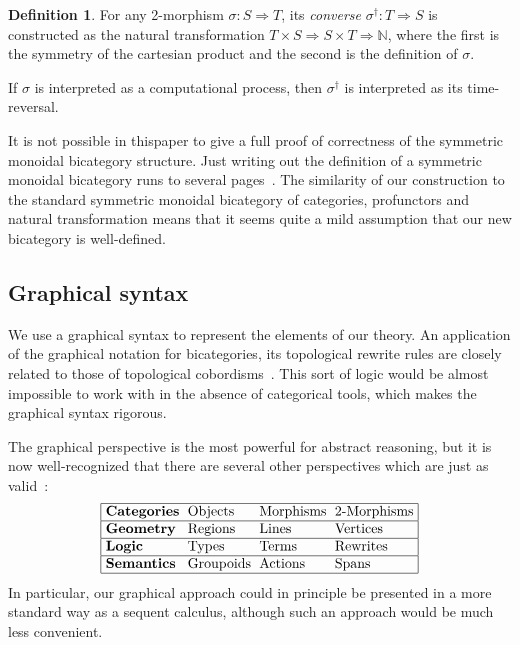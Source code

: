 \documentclass[a4paper,12pt]{article}
\newtheorem{lemma}[theorem]{Lemma}
\theoremstyle{definition}
\newtheorem{defn}[theorem]{Definition}
\newcommand\ignore[1]{}
\newcommand\cat[1]{{\ensuremath{\bf #1}}}
\newcommand\N{\ensuremath{\mathbb{N}}}
\renewcommand{\-}[0]{\nobreakdash-\hspace{0pt}}
\newcommand\GA{\cat{GpdAct}{}}
\begin{document}
\begin{defn}
For any 2-morphism $\sigma: S \Rightarrow T$, its \textit{converse} $\sigma ^\dag : T \Rightarrow S$ is constructed as the natural transformation \mbox{$T \times S \Rightarrow S \times T \Rightarrow \N$}, where the first is the symmetry of the cartesian product and the second is the definition of $\sigma$.
\end{defn}

\noindent
If $\sigma$ is interpreted as a computational process, then $\sigma ^\dag$ is interpreted as its time-reversal.

It is not possible in this{}paper to give a full proof of correctness of the symmetric monoidal bicategory structure. Just writing out the definition of a symmetric monoidal bicategory runs to several pages~\cite[Section 2.2]{sp11-thesis}. The similarity of our construction to the standard symmetric monoidal bicategory of categories, profunctors and natural transformation means that it seems quite a mild assumption that our new bicategory is well-defined.

\ignore{
We do check one detail here, to give a sense of the necessary proof style.
\begin{lemma}
Horizontal composition of 2\-cells in $\GA$ is well-defined.
\end{lemma}
\begin{proof}
LET'S SEE IF WE HAVE SPACE FOR THIS.
\end{proof}
}

\subsection{Graphical syntax}
\label{sec:syntax}

\noindent
We use a graphical syntax to represent the elements of our theory. An application of the graphical notation for bicategories, its topological rewrite rules are closely related to those of topological cobordisms~\cite{sp11-thesis}. This sort of logic would be almost impossible to work with in the absence of categorical tools, which makes the graphical syntax rigorous.

The graphical perspective is the most powerful for abstract reasoning, but it is now well-recognized that there are several other perspectives which are just as valid~\cite{bs10-rosetta, s11-sgl}:
$$\def\gap{6pt}
\begin{tabular}{|@{\,\,}l@{\hspace{\gap}}l@{\hspace{\gap}}l@{\hspace{\gap}}l@{\,\,}|}
\hline
\bf Categories & Objects & Morphisms & 2-Morphisms
\\\hline
\bf Geometry & Regions & Lines & Vertices
\\\hline
\bf Logic & Types & Terms & Rewrites
\\
\hline
\bf Semantics & Groupoids & Actions & Spans
\\
\hline
\end{tabular}
$$
In particular, our graphical approach could in principle be presented in a more standard way as a sequent calculus, although such an approach would be much less convenient.
\end{document}
